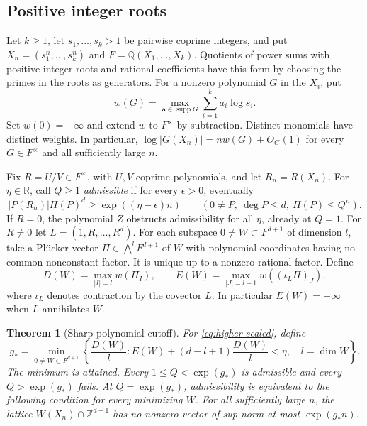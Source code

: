 \documentclass[11pt,a4paper,reqno]{amsart}
\newtheorem{theorem}{Theorem}[section]
\theoremstyle{definition}
\theoremstyle{remark}
\numberwithin{equation}{section}
\begin{document}
\subsection{Positive integer roots}

Let \(k\ge1\), let \(s_1,\ldots,s_k>1\) be pairwise coprime integers,
and put \(X_n=(s_1^n,\ldots,s_k^n)\) and
\(F=\mathbb Q(X_1,\ldots,X_k)\). Quotients of power sums with
positive integer roots and rational coefficients have this form
by choosing the primes in the roots as generators. For a
nonzero polynomial \(G\) in the \(X_i\), put
\[
 w(G)=\max_{\boldsymbol a\in\operatorname{supp}G}
       \sum_{i=1}^k a_i\log s_i .
\]
Set \(w(0)=-\infty\) and extend \(w\) to \(F^\times\) by subtraction.
Distinct monomials have distinct weights. In particular,
\(\log |G(X_n)|=nw(G)+O_G(1)\) for every \(G\in F^\times\)
and all sufficiently large \(n\).

Fix \(R=U/V\in F^\times\), with \(U,V\) coprime polynomials,
and let \(R_n=R(X_n)\). For \(\eta\in\mathbb R\), call \(Q\ge1\)
\emph{admissible} if for every \(\epsilon>0\), eventually
\begin{equation}\label{eq:higher-scaled}
 |P(R_n)|H(P)^d\ge \exp((\eta-\epsilon)n)
 \qquad(0\ne P,\ \deg P\le d,\ H(P)\le Q^n).
\end{equation}
If \(R=0\), the polynomial \(Z\) obstructs admissibility for
all \(\eta\), already at \(Q=1\). For \(R\ne0\) let
\(L=(1,R,\ldots,R^d)\). For each subspace
\(0\ne W\subset F^{d+1}\) of dimension \(l\), take a Pl\"ucker
vector \(\Pi\in\bigwedge^l F^{d+1}\) of \(W\) with polynomial
coordinates having no common nonconstant factor. It is unique
up to a nonzero rational factor. Define
\begin{equation}\label{eq:higher-DE}
 D(W)=\max_{|I|=l} w(\Pi_I),\qquad
 E(W)=\max_{|J|=l-1} w((\iota_L\Pi)_J),
\end{equation}
where \(\iota_L\) denotes contraction by the covector \(L\).
In particular \(E(W)=-\infty\) when \(L\) annihilates \(W\).

\begin{theorem}[Sharp polynomial cutoff]\label{thm:polycut}
For \eqref{eq:higher-scaled}, define
\begin{equation}\label{eq:higher-min}
 g_*=\min_{0\ne W\subset F^{d+1}}
 \left\{\frac{D(W)}{l}:
   E(W)+(d-l+1)\frac{D(W)}{l}<\eta,\quad l=\dim W\right\}.
\end{equation}
The minimum is attained. Every \(1\le Q<\exp(g_*)\) is
admissible and every \(Q>\exp(g_*)\) fails. At \(Q=\exp(g_*)\),
admissibility is equivalent to the following condition for every
minimizing \(W\). For all sufficiently large \(n\), the lattice
\(W(X_n)\cap\mathbb Z^{d+1}\) has no nonzero vector of sup norm
at most \(\exp(g_* n)\).
\end{theorem}
\end{document}

